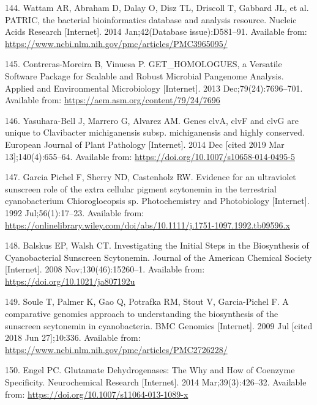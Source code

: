 \documentclass[12pt,twoside]{reedthesis}
\begin{document}
  \hypertarget{ref-wattam_patric_2014}{}
  144. Wattam AR, Abraham D, Dalay O, Disz TL, Driscoll T, Gabbard JL, et
  al. PATRIC, the bacterial bioinformatics database and analysis resource.
  Nucleic Acids Research {[}Internet{]}. 2014 Jan;42(Database
  issue):D581--91. Available from:
  \url{https://www.ncbi.nlm.nih.gov/pmc/articles/PMC3965095/}
  
  \hypertarget{ref-contreras-moreira_get_homologues_2013}{}
  145. Contreras-Moreira B, Vinuesa P. GET\_HOMOLOGUES, a Versatile
  Software Package for Scalable and Robust Microbial Pangenome Analysis.
  Applied and Environmental Microbiology {[}Internet{]}. 2013
  Dec;79(24):7696--701. Available from:
  \url{https://aem.asm.org/content/79/24/7696}
  
  \hypertarget{ref-yasuhara-bell_genes_2014}{}
  146. Yasuhara-Bell J, Marrero G, Alvarez AM. Genes clvA, clvF and clvG
  are unique to Clavibacter michiganensis subsp. michiganensis and highly
  conserved. European Journal of Plant Pathology {[}Internet{]}. 2014 Dec
  {[}cited 2019 Mar 13{]};140(4):655--64. Available from:
  \url{https://doi.org/10.1007/s10658-014-0495-5}
  
  \hypertarget{ref-garciapichel_evidence_1992}{}
  147. Garcia Pichel F, Sherry ND, Castenholz RW. Evidence for an
  ultraviolet sunscreen role of the extra cellular pigment scytonemin in
  the terrestrial cyanobacterium Chiorogloeopsis sp. Photochemistry and
  Photobiology {[}Internet{]}. 1992 Jul;56(1):17--23. Available from:
  \url{https://onlinelibrary.wiley.com/doi/abs/10.1111/j.1751-1097.1992.tb09596.x}
  
  \hypertarget{ref-balskus_investigating_2008}{}
  148. Balskus EP, Walsh CT. Investigating the Initial Steps in the
  Biosynthesis of Cyanobacterial Sunscreen Scytonemin. Journal of the
  American Chemical Society {[}Internet{]}. 2008 Nov;130(46):15260--1.
  Available from: \url{https://doi.org/10.1021/ja807192u}
  
  \hypertarget{ref-soule_comparative_2009}{}
  149. Soule T, Palmer K, Gao Q, Potrafka RM, Stout V, Garcia-Pichel F. A
  comparative genomics approach to understanding the biosynthesis of the
  sunscreen scytonemin in cyanobacteria. BMC Genomics {[}Internet{]}. 2009
  Jul {[}cited 2018 Jun 27{]};10:336. Available from:
  \url{https://www.ncbi.nlm.nih.gov/pmc/articles/PMC2726228/}
  
  \hypertarget{ref-engel_glutamate_2014}{}
  150. Engel PC. Glutamate Dehydrogenases: The Why and How of Coenzyme
  Specificity. Neurochemical Research {[}Internet{]}. 2014
  Mar;39(3):426--32. Available from:
  \url{https://doi.org/10.1007/s11064-013-1089-x}
  
\end{document}
